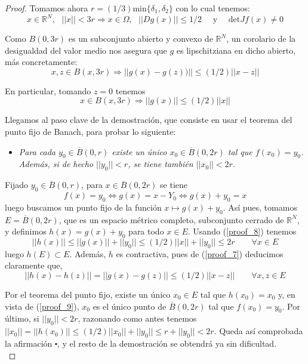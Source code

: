 \documentclass[a4paper, 12pt]{article}
\begin{document}
\begin{enumerate}[label=\textbf{\arabic*}.]
\begin{proof}
Tomamos ahora \(r = (1/3) \text{min} \{\delta_1, \delta_2\}\) con lo cual tenemos:
\begin{equation}\label{proof_6}
	x \in \mathbb{R}^N, \text{ } ||x|| < 3r \Rightarrow x \in \Omega, \text{ } ||Dg(x)|| \leq 1/2 \quad  \text{ y } \quad \text{det}Jf(x) \neq 0
\end{equation}

Como \(B(0, 3r)\) es un subconjunto abierto y convexo de \(\mathbb{R}^N\), un corolario de la desigualdad del valor medio nos asegura que \(g\) es lipschitziana en dicho abierto, más concretamente:
\begin{equation}\label{proof_7}
	x,z \in B(x, 3r) \Rightarrow ||g(x) - g(z))|| \leq (1/2) ||x-z||
\end{equation}

En particular, tomando \(z= 0\) tenemos
\begin{equation}\label{proof_8}
x \in B(x, 3r) \Rightarrow ||g(x) || \leq (1/2) ||x||
\end{equation}

Llegamos al paso clave de la demostración, que consiste en usar el teorema del punto fijo de Banach, para probar lo siguiente:
\begin{itemize}
	\item \textit{Para cada \(y_0 \in \overline{B} (0,r)\) existe un único \(x_0 \in \overline{B} (0,2r)\) tal que \(f(x_0) = y_0\). Además, si de hecho \(||y_0|| < r\), se tiene también \(||x_0|| < 2r\)}.
\end{itemize}

Fijado \(y_0 \in \overline{B} (0,r)\), para \(x \in \overline{B} (0,2r)\) se tiene
\begin{equation}\label{proof_9}
	f(x) = y_0 \Longleftrightarrow g(x) = x - Y_0 \Longleftrightarrow g(x) + y_0 = x
\end{equation}
luego buscamos un punto fijo de la función \(x \mapsto g(x) + y_0\). Así pues, tomamos \(E = \overline{B} (0,2r)\), que es un espacio métrico completo, subconjunto cerrado de \(\mathbb{R}^N\), y definimos \(h(x) = g(x) + y_0\) para todo \(x \in E\). Usando (\ref{proof_8}) tenemos
\[
	||h(x)|| \leq ||g(x)|| + ||y_0|| \leq (1/2) ||x|| + ||y_0|| \leq 2r \qquad \forall x \in E
\]
luego \(h(E) \subset E\). Además, \(h\) es contractiva, pues de (\ref{proof_7}) deducimos claramente que,
\[
	||h(x) - h(z)|| = ||g(x) - g(z)|| \leq (1/2) ||x-z|| \qquad \forall x,z \in E
\]

Por el teorema del punto fijo, existe un único \(x_0 \in E\) tal que \(h(x_0) = x_0\) y, en vista de (\ref{proof_9}), \(x_0\) es el único punto de \(\overline{B}(0,2r)\) tal que \(f(x_0) = y_0\). Por último, si \(||y_0|| < 2r\), razonando como antes tenemos \(||x_0|| = ||h(x_0)|| \leq (1/2) ||x_0|| + ||y_0|| \leq r + ||y_0|| < 2r\). Queda así comprobada la afirmación \(\centerdot\), y el resto de la demostración se obtendrá ya sin dificultad. \\


\end{proof}
\end{enumerate}
\end{document}
